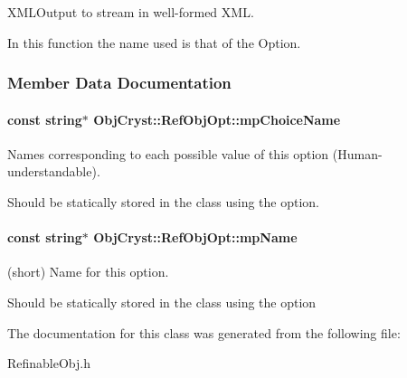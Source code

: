 \-X\-M\-L\-Output to stream in well-\/formed \-X\-M\-L. 

\-In this function the name used is that of the \-Option. 

\subsubsection{\-Member \-Data \-Documentation}
\paragraph[{mp\-Choice\-Name}]{\setlength{\rightskip}{0pt plus 5cm}const string$\ast$ {\bf \-Obj\-Cryst\-::\-Ref\-Obj\-Opt\-::mp\-Choice\-Name}\hspace{0.3cm}{\ttfamily  [protected]}}\label{a00078_abc47d0f345c4121b6492e754b30f4fef}


\-Names corresponding to each possible value of this option (\-Human-\/understandable). 

\-Should be statically stored in the class using the option. 
\paragraph[{mp\-Name}]{\setlength{\rightskip}{0pt plus 5cm}const string$\ast$ {\bf \-Obj\-Cryst\-::\-Ref\-Obj\-Opt\-::mp\-Name}\hspace{0.3cm}{\ttfamily  [protected]}}\label{a00078_a45eb6eed7f6578f438433acddb2f1eb2}


(short) \-Name for this option. 

\-Should be statically stored in the class using the option 

\-The documentation for this class was generated from the following file\-:\begin{DoxyCompactItemize}
\item 
\-Refinable\-Obj.\-h\end{DoxyCompactItemize}
